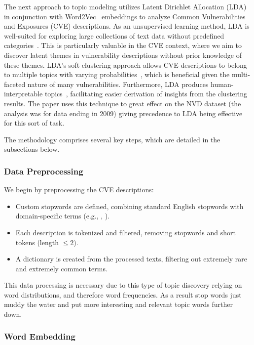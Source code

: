 The next approach to topic modeling utilizes Latent Dirichlet Allocation (LDA)~\cite{lda_origin} in conjunction with Word2Vec~\cite{word2vec} embeddings to analyze Common Vulnerabilities and Exposures (CVE) descriptions. As an unsupervised learning method, LDA is well-suited for exploring large collections of text data without predefined categories~\cite{lda_origin, latent_handbook}. This is particularly valuable in the CVE context, where we aim to discover latent themes in vulnerability descriptions without prior knowledge of these themes. LDA's soft clustering approach allows CVE descriptions to belong to multiple topics with varying probabilities~\cite{latent_handbook}, which is beneficial given the multi-faceted nature of many vulnerabilities. Furthermore, LDA produces human-interpretable topics~\cite{lda_origin}, facilitating easier derivation of insights from the clustering results. The paper \cite{cve_topic_modelling} uses this technique to great effect on the NVD dataset (the analysis was for data ending in 2009) giving precedence to LDA being effective for this sort of task.

The methodology comprises several key steps, which are detailed in the subsections below.

\subsubsection{Data Preprocessing} We begin by preprocessing the CVE descriptions:

\begin{itemize}
	\item Custom stopwords are defined, combining standard English stopwords with domain-specific terms (e.g., , ).
	\item Each description is tokenized and filtered, removing stopwords and short tokens (length $\leq 2$).
	\item A dictionary is created from the processed texts, filtering out extremely rare and extremely common terms.
\end{itemize}

This data processing is necessary due to this type of topic discovery relying on word distributions, and therefore word frequencies. As a result stop words just muddy the water and put more interesting and relevant topic words further down.


\subsubsection{Word Embedding}

